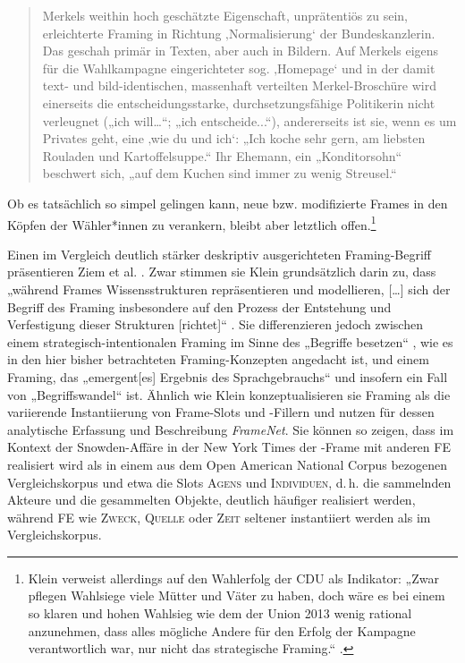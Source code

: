 \begin{quote}
Merkels weithin hoch geschätzte Eigenschaft, unprätentiös zu sein, erleichterte Framing in Richtung ‚Normalisierung` der Bundeskanzlerin. Das geschah primär in Texten, aber auch in Bildern. Auf Merkels eigens für die Wahlkampagne eingerichteter sog. ‚Homepage` und in der damit text- und bild-identischen, massenhaft verteilten Merkel-Broschüre wird einerseits die entscheidungsstarke, durchsetzungsfähige Politikerin nicht verleugnet („ich will\ldots``; „ich entscheide...``), andererseits ist sie, wenn es um Privates geht, eine ‚wie du und ich`: „Ich koche sehr gern, am liebsten Rouladen und Kartoffelsuppe.`` Ihr Ehemann, ein „Konditorsohn`` beschwert sich, „auf dem Kuchen sind immer zu wenig Streusel.`` \autocite[315-316]{kleinFrameUndFraming2018}
\end{quote}

Ob es tatsächlich so simpel gelingen kann, neue bzw. modifizierte Frames in den Köpfen der Wähler*innen zu verankern, bleibt aber letztlich offen.\footnote{Klein verweist allerdings auf den Wahlerfolg der CDU als Indikator: „Zwar pflegen Wahlsiege viele Mütter und Väter zu haben, doch wäre es bei einem so klaren und hohen Wahlsieg wie dem der Union 2013 wenig rational anzunehmen, dass alles mögliche Andere für den Erfolg der Kampagne verantwortlich war, nur nicht das strategische Framing.`` \autocite*[327]{kleinFrameUndFraming2018}.}

Einen im Vergleich deutlich stärker deskriptiv ausgerichteten Framing-Begriff präsentieren Ziem et al. \autocite*{ziemMedienFramesAlsSemantische2018}. Zwar stimmen sie Klein grundsätzlich darin zu, dass „während Frames Wissensstrukturen repräsentieren und modellieren, {[}\ldots{]} sich der Begriff des Framing insbesondere auf den Prozess der Entstehung und Verfestigung dieser Strukturen {[}richtet{]}`` \autocite[159]{ziemMedienFramesAlsSemantische2018}. Sie differenzieren jedoch zwischen einem strategisch-intentionalen Framing im Sinne des „Begriffe besetzen`` \autocite{liedtkeBegriffeBesetzenStrategien1991}, wie es in den hier bisher betrachteten Framing-Konzepten angedacht ist, und einem Framing, das „emergent{[}es{]} Ergebnis des Sprachgebrauchs`` \autocite[159]{ziemMedienFramesAlsSemantische2018} und insofern ein Fall von „Begriffswandel`` \autocite{kellerSprachwandelUnsichtbarenHand2003} ist. Ähnlich wie Klein konzeptualisieren sie Framing als die variierende Instantiierung von Frame-Slots und -Fillern und nutzen für dessen analytische Erfassung und Beschreibung \emph{FrameNet}. Sie können so zeigen, dass im Kontext der Snowden-Affäre in der New York Times der -Frame mit anderen FE realisiert wird als in einem aus dem Open American National Corpus bezogenen Vergleichskorpus und etwa die Slots \textsc{Agens} und \textsc{Individuen}, d.\,h. die sammelnden Akteure und die gesammelten Objekte, deutlich häufiger realisiert werden, während FE wie \textsc{Zweck}, \textsc{Quelle} oder \textsc{Zeit} seltener instantiiert werden als im Vergleichskorpus.

